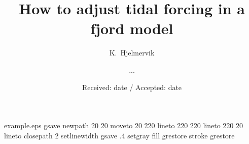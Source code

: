 \begin{filecontents*}{example.eps}
gsave
newpath
  20 20 moveto
  20 220 lineto
  220 220 lineto
  220 20 lineto
closepath
2 setlinewidth
gsave
  .4 setgray fill
grestore
stroke
grestore
\end{filecontents*}

\RequirePackage{fix-cm}
%
\documentclass[smallcondensed]{svjour3}     %
%
\smartqed  %
%
\usepackage{graphicx}
%
%
%
%
\usepackage{hhline}
\usepackage{natbib}
\usepackage{subfigure}
\usepackage{amssymb}
\usepackage[latin1]{inputenc}
\usepackage[usenames]{color}

%


\title{How to adjust tidal forcing in a fjord model
}


\author{K.~Hjelmervik \and ...
}



\date{Received: date / Accepted: date}


\maketitle

